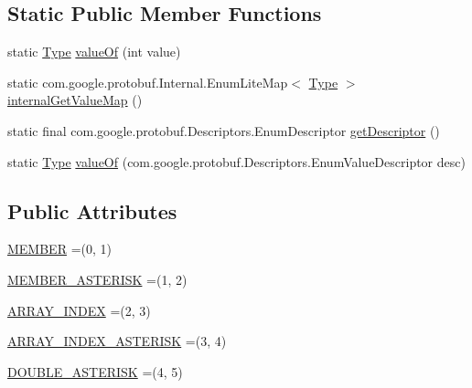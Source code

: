 \subsection*{Static Public Member Functions}
\begin{DoxyCompactItemize}
\item 
static \mbox{\hyperlink{enumcom_1_1mysql_1_1cj_1_1x_1_1protobuf_1_1_mysqlx_expr_1_1_document_path_item_1_1_type}{Type}} \mbox{\hyperlink{enumcom_1_1mysql_1_1cj_1_1x_1_1protobuf_1_1_mysqlx_expr_1_1_document_path_item_1_1_type_a2a1ed1cea29520a7975e8a25d51ed977}{value\+Of}} (int value)
\item 
static com.\+google.\+protobuf.\+Internal.\+Enum\+Lite\+Map$<$ \mbox{\hyperlink{enumcom_1_1mysql_1_1cj_1_1x_1_1protobuf_1_1_mysqlx_expr_1_1_document_path_item_1_1_type}{Type}} $>$ \mbox{\hyperlink{enumcom_1_1mysql_1_1cj_1_1x_1_1protobuf_1_1_mysqlx_expr_1_1_document_path_item_1_1_type_a3fd51b0e77eeb0d5faa9957abdc8ce29}{internal\+Get\+Value\+Map}} ()
\item 
static final com.\+google.\+protobuf.\+Descriptors.\+Enum\+Descriptor \mbox{\hyperlink{enumcom_1_1mysql_1_1cj_1_1x_1_1protobuf_1_1_mysqlx_expr_1_1_document_path_item_1_1_type_a1f0b41d5ad1ac0b95b2b80d038f43fe6}{get\+Descriptor}} ()
\item 
static \mbox{\hyperlink{enumcom_1_1mysql_1_1cj_1_1x_1_1protobuf_1_1_mysqlx_expr_1_1_document_path_item_1_1_type}{Type}} \mbox{\hyperlink{enumcom_1_1mysql_1_1cj_1_1x_1_1protobuf_1_1_mysqlx_expr_1_1_document_path_item_1_1_type_ab38a2148b0d2c0008b2338a82b2492cf}{value\+Of}} (com.\+google.\+protobuf.\+Descriptors.\+Enum\+Value\+Descriptor desc)
\end{DoxyCompactItemize}
\subsection*{Public Attributes}
\begin{DoxyCompactItemize}
\item 
\mbox{\hyperlink{enumcom_1_1mysql_1_1cj_1_1x_1_1protobuf_1_1_mysqlx_expr_1_1_document_path_item_1_1_type_a3e62a5611093dba434fb57e24765f909}{M\+E\+M\+B\+ER}} =(0, 1)
\item 
\mbox{\hyperlink{enumcom_1_1mysql_1_1cj_1_1x_1_1protobuf_1_1_mysqlx_expr_1_1_document_path_item_1_1_type_ada63277ec8911a0f8589dc3b1163d710}{M\+E\+M\+B\+E\+R\+\_\+\+A\+S\+T\+E\+R\+I\+SK}} =(1, 2)
\item 
\mbox{\hyperlink{enumcom_1_1mysql_1_1cj_1_1x_1_1protobuf_1_1_mysqlx_expr_1_1_document_path_item_1_1_type_ad8a3c12296288cb36613aa2e6f487ea4}{A\+R\+R\+A\+Y\+\_\+\+I\+N\+D\+EX}} =(2, 3)
\item 
\mbox{\hyperlink{enumcom_1_1mysql_1_1cj_1_1x_1_1protobuf_1_1_mysqlx_expr_1_1_document_path_item_1_1_type_a050875de30c80a426b3bc303b9d70000}{A\+R\+R\+A\+Y\+\_\+\+I\+N\+D\+E\+X\+\_\+\+A\+S\+T\+E\+R\+I\+SK}} =(3, 4)
\item 
\mbox{\hyperlink{enumcom_1_1mysql_1_1cj_1_1x_1_1protobuf_1_1_mysqlx_expr_1_1_document_path_item_1_1_type_a494d1054c235a1e3a6ac79bf42fee4f9}{D\+O\+U\+B\+L\+E\+\_\+\+A\+S\+T\+E\+R\+I\+SK}} =(4, 5)
\end{DoxyCompactItemize}
